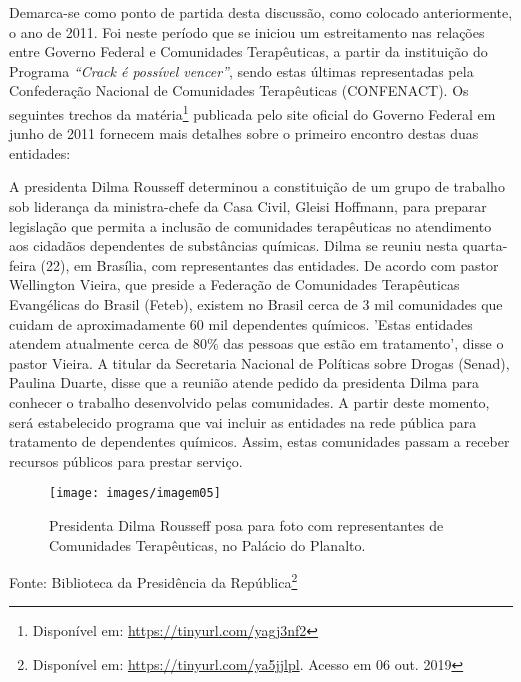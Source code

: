 \documentclass[
	12pt,				%
	oneside,			%
	a4paper,			%
	sumario=tradicional,
	english,			%
	brazil				%
	]{abntex2}
\newcommand{\bcenter}{\begin{center}}
\newcommand{\ecenter}{\end{center}}
\begin{document}
Demarca-se como ponto de partida desta discussão, como colocado anteriormente, o ano de 2011. Foi neste período que se iniciou um estreitamento nas relações entre Governo Federal e Comunidades Terapêuticas, a partir da instituição do Programa \emph{``Crack é possível vencer''}, sendo estas últimas representadas pela Confederação Nacional de Comunidades Terapêuticas (\acrshort{CONFENACT}). Os seguintes trechos da matéria\footnote{Disponível em: \url{https://tinyurl.com/yagj3nf2}} publicada pelo site oficial do Governo Federal em junho de 2011 fornecem mais detalhes sobre o primeiro encontro destas duas entidades:
\begin{quoting}[rightmargin=0cm,leftmargin=4cm]
\begin{singlespace}
{\footnotesize 
  A presidenta Dilma Rousseff determinou a constituição de um grupo de trabalho sob liderança da ministra-chefe da Casa Civil, Gleisi Hoffmann, para preparar legislação que permita a inclusão de comunidades terapêuticas no atendimento aos cidadãos dependentes de substâncias químicas. Dilma se reuniu nesta quarta-feira (22), em Brasília, com representantes das entidades. De acordo com pastor Wellington Vieira, que preside a Federação de Comunidades Terapêuticas Evangélicas do Brasil (Feteb), existem no Brasil cerca de 3 mil comunidades que cuidam de aproximadamente 60 mil dependentes químicos. 'Estas entidades atendem atualmente cerca de 80\% das pessoas que estão em tratamento', disse o pastor Vieira. A titular da Secretaria Nacional de Políticas sobre Drogas (Senad), Paulina Duarte, disse que a reunião atende pedido da presidenta Dilma para conhecer o trabalho desenvolvido pelas comunidades. A partir deste momento, será estabelecido programa que vai incluir as entidades na rede pública para tratamento de dependentes químicos. Assim, estas comunidades passam a receber recursos públicos para prestar serviço.}
\end{singlespace}  
\end{quoting}
\begin{figure}[H]

{\centering \texttt{[image: images/imagem05]} 

}

\caption{Presidenta Dilma Rousseff posa para foto com representantes de Comunidades Terapêuticas, no Palácio do Planalto.}\label{fig:imagem5}
\end{figure}
\bcenter

Fonte: Biblioteca da Presidência da República\footnote{Disponível em: \url{https://tinyurl.com/ya5jjlpl}. Acesso em 06 out. 2019}
\ecenter
\end{document}

